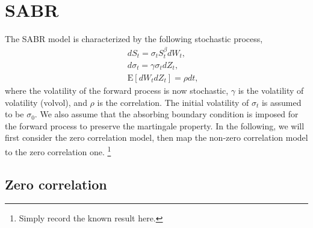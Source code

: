 \documentclass[12pt]{article}
\begin{document}
\section{SABR}

  The SABR model is characterized by the following stochastic process,
  \begin{eqnarray}
    && dS_t=\sigma_t S_t^{\beta}dW_t,\nonumber\\
    && d\sigma_t=\gamma\sigma_tdZ_t,\\
    && {\mathrm E}[dW_tdZ_t]=\rho dt,\nonumber
  \end{eqnarray}
  where the volatility of the forward process is now stochastic, $\gamma$ is the volatility of volatility (volvol),
  and $\rho$ is the correlation. The initial volatility of $\sigma_t$ is assumed to be $\sigma_0$. We also assume that
  the absorbing boundary condition is imposed for the forward process to preserve the martingale property.
  In the following, we will first consider the zero correlation model, then map the non-zero
  correlation model to the zero correlation one. \footnote{Simply record the known result here.}

  \subsection{Zero correlation}
\end{document}
